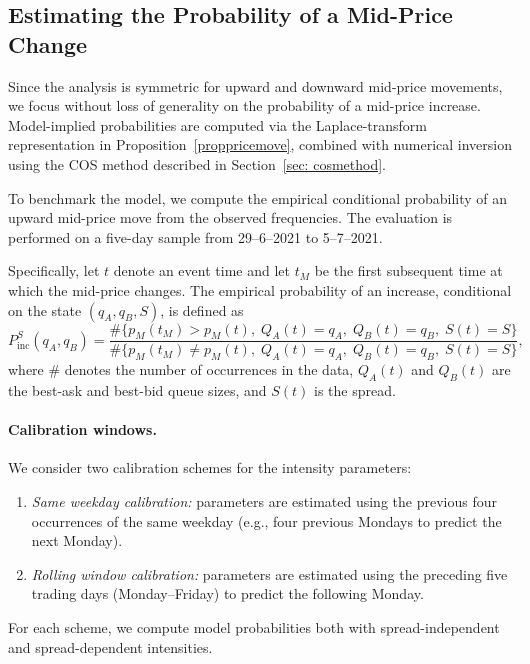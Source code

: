 \documentclass[11pt]{article}
\begin{document}
\subsection{Estimating the Probability of a Mid-Price Change}\label{sec: results_midprice}

Since the analysis is symmetric for upward and downward mid-price movements, we focus without loss of generality on the probability of a mid-price increase. Model-implied probabilities are computed via the Laplace-transform representation in Proposition~\ref{proppricemove}, combined with numerical inversion using the COS method described in Section~\ref{sec: cosmethod}. 

To benchmark the model, we compute the empirical conditional probability of an upward mid-price move from the observed frequencies. The evaluation is performed on a five-day sample from 29--6--2021 to 5--7--2021. 

Specifically, let $t$ denote an event time and let $t_M$ be the first subsequent time at which the mid-price changes. The empirical probability of an increase, conditional on the state $(q_A,q_B,S)$, is defined as
\begin{equation}\label{emp_pricemove}
    P_{\mathrm{inc}}^{S}(q_A,q_B)
    =
    \frac{
    \#\big\{p_M(t_M)>p_M(t),\; Q_A(t)=q_A,\; Q_B(t)=q_B,\; S(t)=S\big\}
    }{
    \#\big\{p_M(t_M)\neq p_M(t),\; Q_A(t)=q_A,\; Q_B(t)=q_B,\; S(t)=S\big\}
    },
\end{equation}
where $\#$ denotes the number of occurrences in the data, $Q_A(t)$ and $Q_B(t)$ are the best-ask and best-bid queue sizes, and $S(t)$ is the spread.

\paragraph{Calibration windows.}
We consider two calibration schemes for the intensity parameters:
\begin{enumerate}
    \item \emph{Same weekday calibration:} parameters are estimated using the previous four occurrences of the same weekday (e.g., four previous Mondays to predict the next Monday).
    \item \emph{Rolling window calibration:} parameters are estimated using the preceding five trading days (Monday--Friday) to predict the following Monday.
\end{enumerate}
For each scheme, we compute model probabilities both with spread-independent and spread-dependent intensities.
\end{document}
